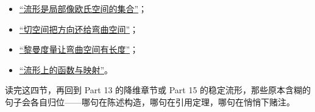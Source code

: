 \begin{itemize}
\tightlist
\item \hyperref[sec:12-Real-Analysis-Support/08-Manifold-Basics/01]{``流形是局部像欧氏空间的集合''}；
\item \hyperref[sec:12-Real-Analysis-Support/08-Manifold-Basics/02]{``切空间把方向还给弯曲空间''}；
\item \hyperref[sec:12-Real-Analysis-Support/08-Manifold-Basics/03]{``黎曼度量让弯曲空间有长度''}；
\item \hyperref[sec:12-Real-Analysis-Support/08-Manifold-Basics/04]{``流形上的函数与映射''}。
\end{itemize}

读完这四节，再回到 Part 13 的降维章节或 Part 15 的稳定流形，那些原本含糊的句子会各自归位——哪句在陈述构造，哪句在引用定理，哪句在悄悄下赌注。
